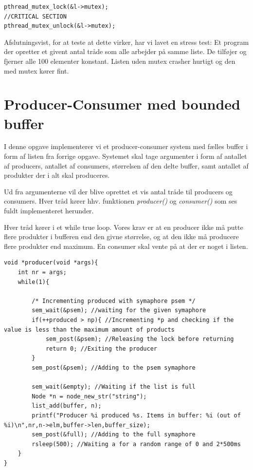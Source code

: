 \documentclass[danish]{report}
\begin{document}
\begin{lstlisting}    
pthread_mutex_lock(&l->mutex);
//CRITICAL SECTION
pthread_mutex_unlock(&l->mutex);
\end{lstlisting}

Afslutningsvist, for at teste at dette virker, har vi lavet en stress test: Et program der opretter et givent antal tråde som alle arbejder på samme liste. De tilføjer og fjerner alle 100 elementer konstant. Listen uden mutex crasher hurtigt og den med mutex kører fint.


\chapter{Producer-Consumer med bounded buffer}

I denne opgave implementerer vi et producer-consumer system med fælles buffer i form af listen fra forrige opgave. Systemet skal tage argumenter i form af antallet af producers, antallet af consumers, størrelsen af den delte buffer, samt antallet af produkter der i alt skal produceres.

Ud fra argumenterne vil der blive oprettet et vis antal tråde til producers og consumers. Hver tråd kører hhv. funktionen \textit{producer()} og \textit{consumer()} som ses fuldt implementeret herunder.

Hver tråd kører i et while true loop. Vores krav er at en producer ikke må putte flere produkter i bufferen end den givne størrelse, og at den ikke må producere flere produkter end maximum. En consumer skal vente på at der er noget i listen.

\begin{lstlisting}    
void *producer(void *args){
	int nr = args;
	while(1){
	
		/* Incrementing produced with symaphore psem */
		sem_wait(&psem); //waiting for the given symaphore
		if(++produced > np){ //Incrementing *p and checking if the value is less than the maximum amount of products
			sem_post(&psem); //Releasing the lock before returning
			return 0; //Exiting the producer
		}
		sem_post(&psem); //Adding to the psem symaphore
		
		sem_wait(&empty); //Waiting if the list is full
		Node *n = node_new_str("string");
		list_add(buffer, n);
		printf("Producer %i produced %s. Items in buffer: %i (out of %i)\n",nr,n->elm,buffer->len,buffer_size);
		sem_post(&full); //Adding to the full symaphore
		rsleep(500); //Waiting a for a random range of 0 and 2*500ms
	}
}
\end{lstlisting}
\end{document}
